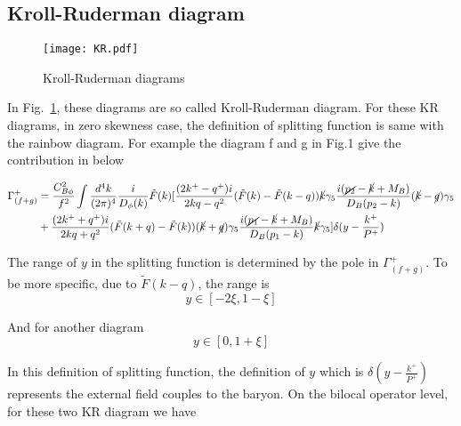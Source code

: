 \documentclass[preprintnumbers,prd,superscriptaddress,preprint]{revtex4-1}
\begin{document}
	
	\subsection{Kroll-Ruderman diagram }
	
	\begin{figure}[htbp]
		\begin{center}
			\texttt{[image: KR.pdf]}
			\caption{Kroll-Ruderman diagrams} 
			\label{fig:krdiagrams}
		\end{center}
	\end{figure}
	
	In Fig.~\ref{fig:krdiagrams}, these diagrams are so called Kroll-Ruderman diagram. For these KR diagrams, in zero skewness case, the definition of  splitting function is same with the rainbow diagram.
	For example the diagram f and g in Fig.1 give the contribution in below
	
	\begin{align*}
		\Gamma_{(f+g)}^{+} & =\frac{C_{B\phi}^{2}}{f^{2}}\int\frac{d^{4}k}{(2\pi)^{4}}\frac{i}{D_{\phi}(k)}\tilde{F}(k)[\frac{(2k^{+}-q^{+})i}{2kq-q^{2}}(\tilde{F}(k)-\tilde{F}(k-q))\cancel{k}\gamma_{5}\frac{i(\cancel{p_{2}}-\cancel{k}+M_{B})}{D_{B}(p_{2}-k)}(\cancel{k}-\cancel{q})\gamma_{5}\\
		& +\frac{(2k^{+}+q^{+})i}{2kq+q^{2}}(\tilde{F}(k+q)-\tilde{F}(k))(\cancel{k}+\cancel{q})\gamma_{5}\frac{i(\cancel{p_{1}}-\cancel{k}+M_{B})}{D_{B}(p_{1}-k)}\cancel{k}\gamma_{5}]\delta(y-\frac{k^{+}}{P^{+}})
	\end{align*}
	
	The range of $y$ in the splitting function is determined by the pole
	in $\Gamma_{(f+g)}^{+}$. To be more specific, due to $\tilde{F}(k-q)$,
	the range is 
	\[
	y\in[-2\xi,1-\xi]
	\]
	
	And for another diagram 
	\[
	y\in[0,1+\xi]
	\]
	
	In this definition of splitting function, the definition of $y$ which
	is $\delta(y-\frac{k^{+}}{P^{+}})$ represents the external field
	couples to the baryon. On the bilocal operator level, for these two KR diagram we have 
	
\end{document}
